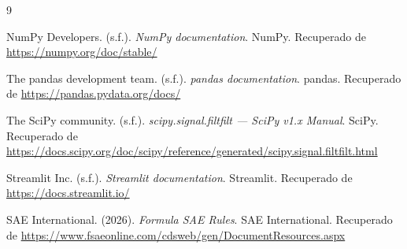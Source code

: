 \documentclass[12pt, letterpaper]{article}
\begin{document}
	\newpage
	\renewcommand{\refname}{Bibliografía}
	\begin{thebibliography}{9}
		
		NumPy Developers. (s.f.). \textit{NumPy documentation}. NumPy. Recuperado de \url{https://numpy.org/doc/stable/}
		
		The pandas development team. (s.f.). \textit{pandas documentation}. pandas. Recuperado de \url{https://pandas.pydata.org/docs/}
		
		The SciPy community. (s.f.). \textit{scipy.signal.filtfilt — SciPy v1.x Manual}. SciPy. Recuperado de \url{https://docs.scipy.org/doc/scipy/reference/generated/scipy.signal.filtfilt.html}
		
		Streamlit Inc. (s.f.). \textit{Streamlit documentation}. Streamlit. Recuperado de \url{https://docs.streamlit.io/}
		
		SAE International. (2026). \textit{Formula SAE Rules}. SAE International. Recuperado de \url{https://www.fsaeonline.com/cdsweb/gen/DocumentResources.aspx}
		
	\end{thebibliography}
	
\end{document}
